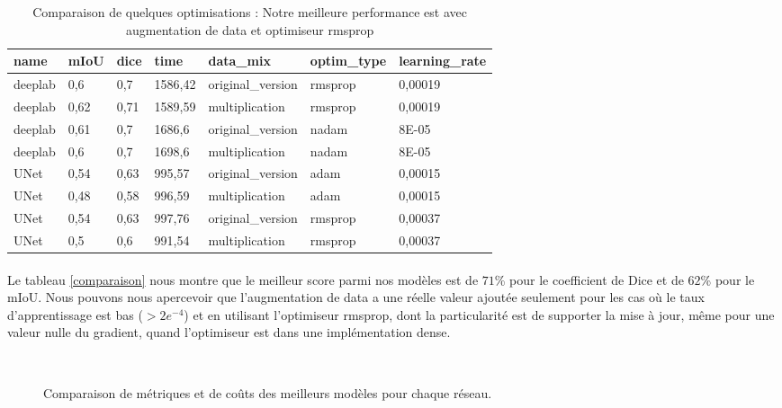 \documentclass[
10pt, %
a4paper, %
oneside, %
headinclude,footinclude, %
]{scrartcl}
\begin{document}
\begin{table}[h]\center
\begin{tabular}{@{}lllllll@{}}
\toprule
name    & mIoU & dice & time    & data\_mix         & optim\_type & learning\_rate \\ \midrule
deeplab & 0,6  & 0,7  & 1586,42 & original\_version & rmsprop     & 0,00019        \\
deeplab & 0,62 & 0,71 & 1589,59 & multiplication    & rmsprop     & 0,00019        \\
deeplab & 0,61 & 0,7  & 1686,6  & original\_version & nadam       & 8E-05          \\
deeplab & 0,6  & 0,7  & 1698,6  & multiplication    & nadam       & 8E-05          \\
UNet    & 0,54 & 0,63 & 995,57  & original\_version & adam        & 0,00015        \\
UNet    & 0,48 & 0,58 & 996,59  & multiplication    & adam        & 0,00015        \\
UNet    & 0,54 & 0,63 & 997,76  & original\_version & rmsprop     & 0,00037        \\
UNet    & 0,5  & 0,6  & 991,54  & multiplication    & rmsprop     & 0,00037        \\ \bottomrule
\end{tabular}
\caption[Comparaison de quelques optimisations]{Comparaison de quelques optimisations : Notre meilleure performance est avec augmentation de data et optimiseur rmsprop}
\label{comparaison_table}
\end{table}

\paragraph{}Le tableau \ref{comparaison} nous montre que le meilleur score parmi nos modèles est de $71$\% pour le  coefficient de Dice et de $62$\% pour le mIoU. Nous pouvons nous apercevoir que l’augmentation de data a une réelle valeur ajoutée seulement pour les cas où le taux d’apprentissage est bas ($>2e^{-4}$) et en utilisant l’optimiseur rmsprop, dont la particularité est de supporter la mise à jour, même pour une valeur nulle du gradient, quand l’optimiseur est dans une implémentation dense.

\begin{figure}[htb]
\centering
{} \quad
{} \\
 \quad
{}
\caption[Mesure des Performances]{Comparaison de métriques et de coûts des meilleurs modèles pour chaque réseau.} %
\label{fig:comparaison}
\end{figure}
\end{document}
